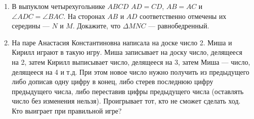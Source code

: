 \documentclass{article}
\begin{document}
\begin{enumerate}
\item В выпуклом четырехугольнике $ABCD$ $AD = CD$,  $AB = AC$ и $ \angle ADC = \angle BAC$. На сторонах $AB$ и $AD$ соответственно отмечены их середины --- $N$ и $M$. Докажите, что $\Delta MNC$ --- равнобедренный. 

\item На паре Анастасия Константиновна написала на доске число 2. Миша и Кирилл играют в такую игру. Миша записывает на доску число, делящееся на 2, затем Кирилл выписывает число, делящееся на 3, затем Миша --- число, делящееся на 4 и т.д. При этом новое число нужно получить из предыдущего либо дописав одну цифру в конец, либо стерев последнюю цифру предыдущего числа, либо переставив цифры предыдущего числа (оставлять число без изменения нельзя). Проигрывает тот, кто не сможет сделать ход. Кто выиграет при правильной игре?

\end{enumerate}
\end{document}
